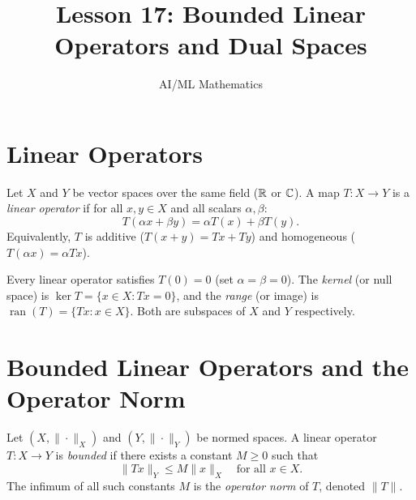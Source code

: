 \documentclass[11pt,a4paper]{article}
\title{Lesson 17: Bounded Linear Operators and Dual Spaces}
\author{AI/ML Mathematics}
\date{}
\begin{document}
\maketitle
\tableofcontents
\newpage


\section{Linear Operators}
\label{sec:linear_ops}

\begin{definition}
\label{def:linear_op}
Let $X$ and $Y$ be vector spaces over the same field ($\mathbb{R}$ or $\mathbb{C}$). A map
$T \colon X \to Y$ is a \emph{linear operator} if for all $x, y \in X$ and
all scalars $\alpha, \beta$:
\[
T(\alpha x + \beta y) = \alpha T(x) + \beta T(y).
\]
Equivalently, $T$ is additive ($T(x+y) = Tx + Ty$) and homogeneous
($T(\alpha x) = \alpha Tx$).
\end{definition}

\begin{remark}
Every linear operator satisfies $T(0) = 0$ (set $\alpha = \beta = 0$). The
\emph{kernel} (or null space) is $\ker T = \{x \in X : Tx = 0\}$, and the
\emph{range} (or image) is $\operatorname{ran}(T) = \{Tx : x \in X\}$. Both
are subspaces of $X$ and $Y$ respectively.
\end{remark}


\section{Bounded Linear Operators and the Operator Norm}
\label{sec:bounded_ops}

\begin{definition}
\label{def:bounded_op}
Let $(X, \|\cdot\|_X)$ and $(Y, \|\cdot\|_Y)$ be normed spaces. A linear
operator $T \colon X \to Y$ is \emph{bounded} if there exists a constant
$M \ge 0$ such that
\[
\|Tx\|_Y \le M \|x\|_X \quad \text{for all } x \in X.
\]
The infimum of all such constants $M$ is the \emph{operator norm} of $T$,
denoted $\|T\|$.
\end{definition}
\end{document}
